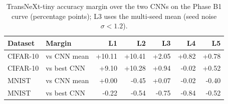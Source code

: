 \begin{table}[htbp]
\centering
\caption{TransNeXt-tiny accuracy margin over the two CNNs on the Phase B1 curve (percentage points); L3 uses the multi-seed mean (seed noise $\sigma < 1.2$).}
\label{tab:b1_gap}
\setlength{\tabcolsep}{5pt}
\renewcommand{\arraystretch}{1.1}
\begin{tabular}{llrrrrr}
\toprule
Dataset & Margin & L1 & L2 & L3 & L4 & L5 \\
\midrule
CIFAR-10 & vs CNN mean & +10.11 & +10.41 & +2.05 & +0.82 & +0.78 \\
CIFAR-10 & vs best CNN & +9.10 & +10.28 & +0.94 & -0.02 & +0.52 \\
MNIST & vs CNN mean & +0.00 & -0.45 & +0.07 & -0.02 & -0.40 \\
MNIST & vs best CNN & -0.22 & -0.54 & -0.75 & -0.84 & -0.52 \\
\bottomrule
\end{tabular}
\end{table}
